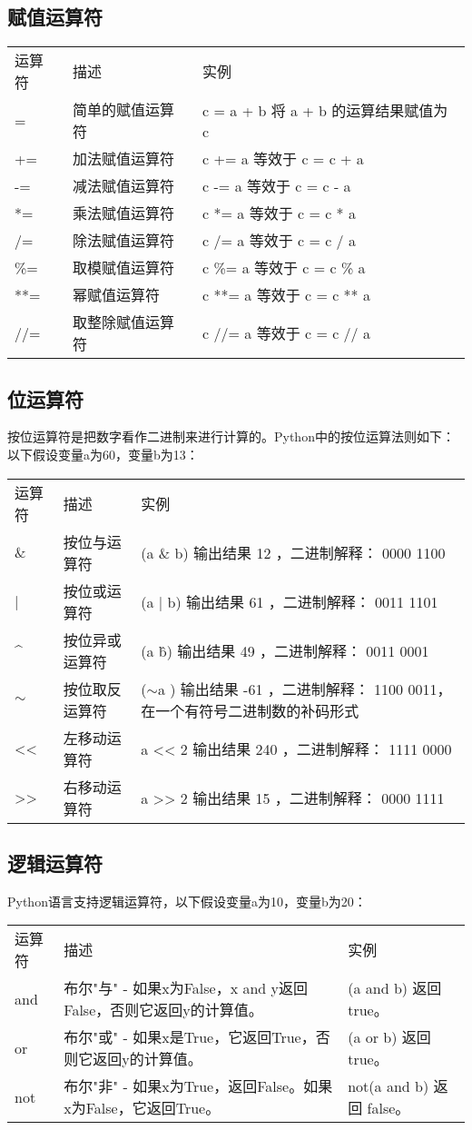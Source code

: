 \subsection{赋值运算符}
\begin{tabular}{l|l|l}
运算符&	描述&	实例\\
=&	简单的赋值运算符&	c = a + b 将 a + b 的运算结果赋值为 c\\
+=&	加法赋值运算符&	c += a 等效于 c = c + a\\
-=&	减法赋值运算符&	c -= a 等效于 c = c - a\\
*=&	乘法赋值运算符&	c *= a 等效于 c = c * a\\
/=&	除法赋值运算符&	c /= a 等效于 c = c / a\\
\%=&	取模赋值运算符&	c \%= a 等效于 c = c \% a\\
**=&	幂赋值运算符&	c **= a 等效于 c = c ** a\\
//=&	取整除赋值运算符&	c //= a 等效于 c = c // a
\end{tabular}


\subsection{位运算符}
按位运算符是把数字看作二进制来进行计算的。Python中的按位运算法则如下：
以下假设变量a为60，变量b为13：

\begin{tabular}{l|l|l}
运算符&	描述&	实例\\
\& &	按位与运算符&	 (a \& b) 输出结果 12 ，二进制解释： 0000 1100\\
|&	按位或运算符&	(a | b) 输出结果 61 ，二进制解释： 0011 1101\\
\^ &	按位异或运算符&	(a \^ b) 输出结果 49 ，二进制解释： 0011 0001\\
$\sim$	&按位取反运算符&	($\sim$a ) 输出结果 -61 ，二进制解释： 1100 0011， 在一个有符号二进制数的补码形式\\
<<&	左移动运算符	&a << 2 输出结果 240 ，二进制解释： 1111 0000\\
>>&	右移动运算符	&a >> 2 输出结果 15 ，二进制解释： 0000 1111
\end{tabular}


\subsection{逻辑运算符}
Python语言支持逻辑运算符，以下假设变量a为10，变量b为20：

\begin{tabular}{l|l|l}
运算符&	描述&	实例\\
and&	布尔"与" - 如果x为False，x and y返回False，否则它返回y的计算值。&	(a and b) 返回 true。\\
or&	布尔"或" - 如果x是True，它返回True，否则它返回y的计算值。&	(a or b) 返回 true。\\
not	&布尔"非" - 如果x为True，返回False。如果x为False，它返回True。&	not(a and b) 返回 false。
\end{tabular}



